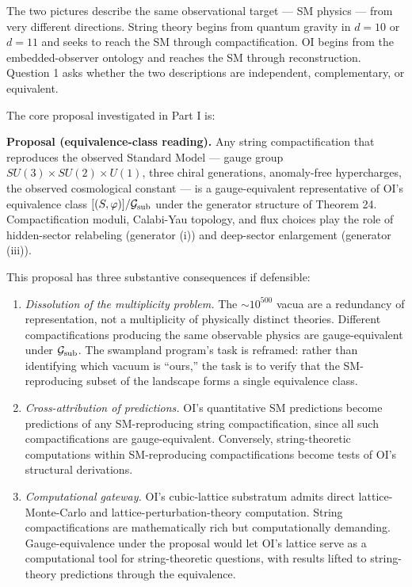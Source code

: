 \documentclass[
]{article}
\begin{document}
The two pictures describe the same observational target --- SM physics
--- from very different directions. String theory begins from quantum
gravity in \(d=10\) or \(d=11\) and seeks to reach the SM through
compactification. OI begins from the embedded-observer ontology and
reaches the SM through reconstruction. Question 1 asks whether the two
descriptions are independent, complementary, or equivalent.

The core proposal investigated in Part I is:

\textbf{Proposal (equivalence-class reading).} Any string
compactification that reproduces the observed Standard Model --- gauge
group \(SU(3) \times SU(2) \times U(1)\), three chiral generations,
anomaly-free hypercharges, the observed cosmological constant --- is a
gauge-equivalent representative of OI's equivalence class
\([(S, \varphi)]/\mathcal{G}_{\rm sub}\) under the generator structure
of Theorem 24. Compactification moduli, Calabi-Yau topology, and flux
choices play the role of hidden-sector relabeling (generator (i)) and
deep-sector enlargement (generator (iii)).

This proposal has three substantive consequences if defensible:

\begin{enumerate}
\def\labelenumi{(\Alph{enumi})}
\item
  \emph{Dissolution of the multiplicity problem.} The \(\sim 10^{500}\)
  vacua are a redundancy of representation, not a multiplicity of
  physically distinct theories. Different compactifications producing
  the same observable physics are gauge-equivalent under
  \(\mathcal{G}_{\rm sub}\). The swampland program's task is reframed:
  rather than identifying which vacuum is ``ours,'' the task is to
  verify that the SM-reproducing subset of the landscape forms a single
  equivalence class.
\item
  \emph{Cross-attribution of predictions.} OI's quantitative SM
  predictions become predictions of any SM-reproducing string
  compactification, since all such compactifications are
  gauge-equivalent. Conversely, string-theoretic computations within
  SM-reproducing compactifications become tests of OI's structural
  derivations.
\item
  \emph{Computational gateway.} OI's cubic-lattice substratum admits
  direct lattice-Monte-Carlo and lattice-perturbation-theory
  computation. String compactifications are mathematically rich but
  computationally demanding. Gauge-equivalence under the proposal would
  let OI's lattice serve as a computational tool for string-theoretic
  questions, with results lifted to string-theory predictions through
  the equivalence.
\end{enumerate}
\end{document}
